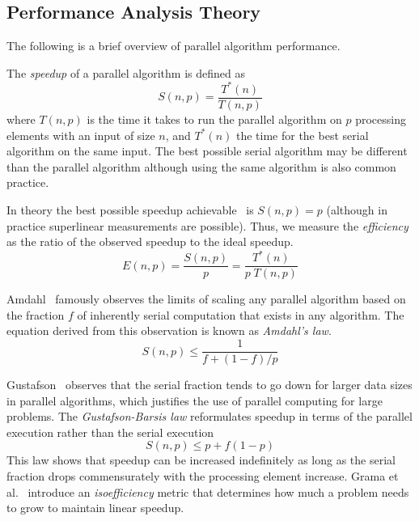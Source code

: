 \documentclass{llncs}
\newcommand*{\lcite}[1]{~\cite{#1}}
\newcommand*{\scite}[1]{~\cite{#1}}
\newcommand{\etal}{et al.\xspace}
\newcommand*{\keyterm}[1]{\emph{#1}}
\begin{document}
\subsection{Performance Analysis Theory}

\noindent
The following is a brief overview of parallel algorithm performance.

The \keyterm{speedup} of a parallel algorithm is defined as
\begin{equation}
  S(n,p) = \frac{T^*(n)}{T(n,p)}
  \label{eq:Speedup}
\end{equation}
where $T(n,p)$ is the time it takes to run the parallel algorithm on $p$
processing elements with an input of size $n$, and $T^*(n)$ the time for the
best serial algorithm on the same input. The best possible serial algorithm
may be different than the parallel algorithm although using the same
algorithm is also common practice.

In theory the best possible speedup achievable\lcite{Faber1986} is $S(n,p)
= p$ (although in practice superlinear measurements are possible). Thus, we
measure the \keyterm{efficiency} as the ratio of the observed speedup to
the ideal speedup.
\begin{equation}
  E(n,p) = \frac{S(n,p)}{p} = \frac{T^*(n)}{p \; T(n,p)}
  \label{eq:Efficiency}
\end{equation}

Amdahl\scite{Amdahl1967} famously observes the limits of scaling any
parallel algorithm based on the fraction $f$ of inherently serial
computation that exists in any algorithm. The equation derived from this
observation is known as \keyterm{Amdahl's law}.
\begin{equation}
  S(n,p) \leq \frac{1}{f + (1-f)/p}
  \label{eq:Amdahl}
\end{equation}

Gustafson\scite{Gustafson1988} observes that the serial fraction tends to
go down for larger data sizes in parallel algorithms, which justifies the
use of parallel computing for large problems. The \keyterm{Gustafson-Barsis
  law} reformulates speedup in terms of the parallel execution rather than
the serial execution
\begin{equation}
  S(n,p) \leq p + f(1-p)
  \label{eq:GustafsonBarsis}
\end{equation}
This law shows that speedup can be increased indefinitely as
long as the serial fraction drops commensurately with the processing
element increase. Grama \etal\scite{Grama1993} introduce an
\keyterm{isoefficiency} metric that determines how much a problem needs to
grow to maintain linear speedup.
\end{document}
